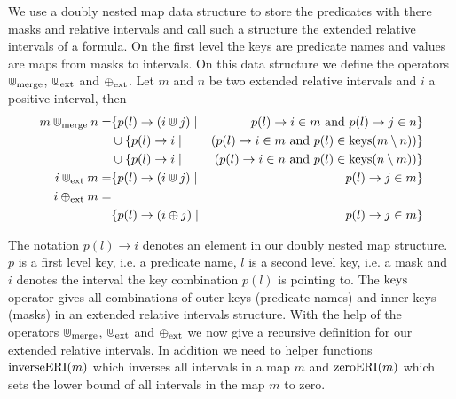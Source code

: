We use a doubly nested map data structure to store the predicates with there masks and relative intervals and call such a structure the extended relative intervals of a formula.
On the first level the keys are predicate names and values are maps from masks to intervals.
On this data structure we define the operators $\Cup_{\text{merge}}$, $\Cup_{\text{ext}}$ and $\oplus_{\text{ext}}$.
Let $m$ and $n$ be two extended relative intervals and $i$ a positive interval, then 
\begin{align*}
    m \Cup_{\text{merge}} n = 
        & \{ p(l) \rightarrow (i \Cup j) \mid &
            p(l) \rightarrow i \in m \text{ and } 
            p(l) \rightarrow j \in n \} \\
        & \cup \{p(l) \rightarrow i \mid & 
            (p(l) \rightarrow i \in m \text{ and }
            p(l) \in \operatorname{keys}({m \setminus n})) \} \\
        & \cup \{p(l) \rightarrow i \mid & 
            (p(l) \rightarrow i \in n \text{ and }
            p(l) \in \operatorname{keys}({n \setminus m}))
            \}        
            \\
    i \Cup_{\text{ext}} m = 
        & \{ p(l) \rightarrow (i \Cup j) \mid &
            p(l) \rightarrow j \in m \} \\
    i \oplus_{\text{ext}} m = \\
        & \{ p(l) \rightarrow (i \oplus j) \mid &
            p(l) \rightarrow j \in m \} \\
\end{align*}

The notation $p(l) \rightarrow i$ denotes an element in our doubly nested map structure.
$p$ is a first level key, i.e. a predicate name, $l$ is a second level key, i.e. a mask and $i$ denotes the interval the key combination $p(l)$ is pointing to.
The $\operatorname{keys}$ operator gives all combinations of outer keys (predicate names) and inner keys (masks) in an extended relative intervals structure.
With the help of the operators $\Cup_{\text{merge}}$, $\Cup_{\text{ext}}$ and $\oplus_{\text{ext}}$ we now give a recursive definition for our extended relative intervals.
In addition we need to helper functions $\operatorname{inverseERI}(m)$ which inverses all intervals in a map $m$ and $\operatorname{zeroERI}(m)$ which sets the lower bound of all intervals in the map $m$ to zero.

